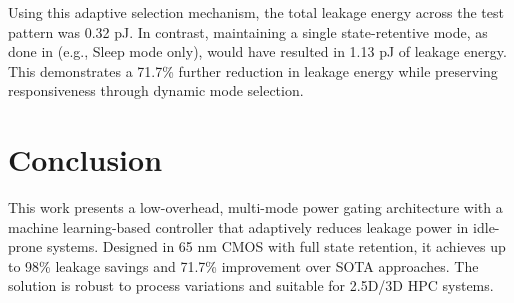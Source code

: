 \documentclass[conference]{IEEEtran}
\begin{document}
Using this adaptive selection mechanism, the total leakage energy across the test pattern was 0.32 pJ. In contrast, maintaining a single state-retentive mode, as done in \cite{patent} (e.g., Sleep mode only), would have resulted in 1.13 pJ of leakage energy. This demonstrates a 71.7\% further reduction in leakage energy while preserving responsiveness through dynamic mode selection.

\section{Conclusion}
This work presents a low-overhead, multi-mode power gating architecture with a machine learning-based controller that adaptively reduces leakage power in idle-prone systems. Designed in 65 nm CMOS with full state retention, it achieves up to 98\% leakage savings and 71.7\% improvement over SOTA approaches. The solution is robust to process variations and suitable for 2.5D/3D HPC systems.

\vspace{-5pt}




\end{document}
